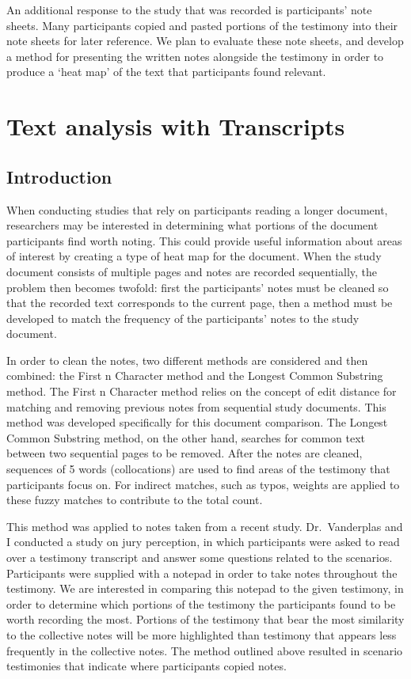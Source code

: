 \documentclass[print]{nuthesis}
\begin{document}
An additional response to the study that was recorded is participants' note sheets.
Many participants copied and pasted portions of the testimony into their note sheets for later reference.
We plan to evaluate these note sheets, and develop a method for presenting the written notes alongside the testimony in order to produce a `heat map' of the text that participants found relevant.

\hypertarget{textcolor}{%
\chapter{Text analysis with Transcripts}\label{textcolor}}

\hypertarget{introduction-1}{%
\section{Introduction}\label{introduction-1}}

When conducting studies that rely on participants reading a longer document, researchers may be interested in determining what portions of the document participants find worth noting.
This could provide useful information about areas of interest by creating a type of heat map for the document.
When the study document consists of multiple pages and notes are recorded sequentially, the problem then becomes twofold: first the participants' notes must be cleaned so that the recorded text corresponds to the current page, then a method must be developed to match the frequency of the participants' notes to the study document.

In order to clean the notes, two different methods are considered and then combined: the First n Character method and the Longest Common Substring method.
The First n Character method relies on the concept of edit distance for matching and removing previous notes from sequential study documents.
This method was developed specifically for this document comparison.
The Longest Common Substring method, on the other hand, searches for common text between two sequential pages to be removed.
After the notes are cleaned, sequences of 5 words (collocations) are used to find areas of the testimony that participants focus on.
For indirect matches, such as typos, weights are applied to these fuzzy matches to contribute to the total count.

This method was applied to notes taken from a recent study.
Dr.~Vanderplas and I conducted a study on jury perception, in which participants were asked to read over a testimony transcript and answer some questions related to the scenarios.
Participants were supplied with a notepad in order to take notes throughout the testimony.
We are interested in comparing this notepad to the given testimony, in order to determine which portions of the testimony the participants found to be worth recording the most.
Portions of the testimony that bear the most similarity to the collective notes will be more highlighted than testimony that appears less frequently in the collective notes.
The method outlined above resulted in scenario testimonies that indicate where participants copied notes.
\end{document}

